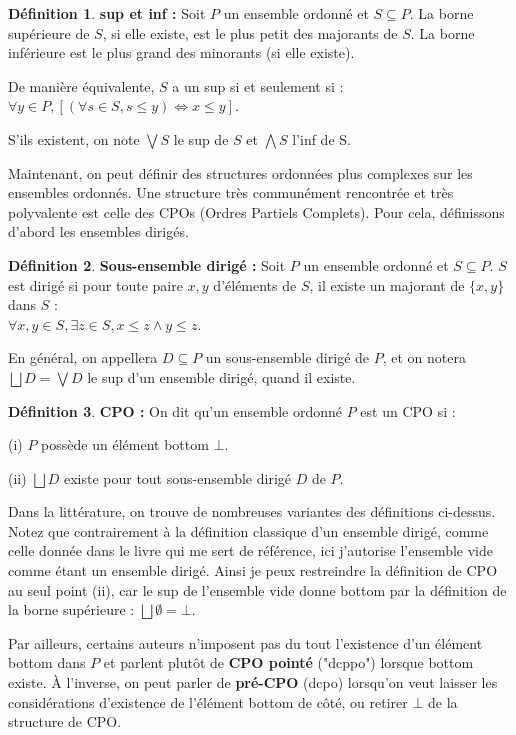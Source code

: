 \documentclass{article}
\theoremstyle{definition}
\newtheorem{definition}{Définition}[section]
\begin{document}
\begin{definition}{\textbf{sup et inf : }}
Soit $P$ un ensemble ordonné et $S \subseteq P$. La borne supérieure de $S$, si elle existe, est le plus petit des majorants de $S$. La borne inférieure est le plus grand des minorants (si elle existe).

De manière équivalente, $S$ a un sup si et seulement si : ~ $\forall y \in P, [(\forall s \in S, s \leq y) \Longleftrightarrow x \leq y]$.

S'ils existent, on note $\bigvee S$ le sup de $S$ et $\bigwedge S$ l'inf de S.
\end{definition}

Maintenant, on peut définir des structures ordonnées plus complexes sur les ensembles ordonnés. Une structure très communément rencontrée et très polyvalente est celle des CPOs (Ordres Partiels Complets). Pour cela, définissons d'abord les ensembles dirigés.

\begin{definition}{\textbf{Sous-ensemble dirigé : }}
Soit $P$ un ensemble ordonné et $S \subseteq P$. $S$ est dirigé si pour toute paire $x,y$ d'éléments de $S$, il existe un majorant de $\{x, y\}$ dans $S$ :\\ $\forall x, y \in S, \exists z \in S, x \leq z \wedge y \leq z$.

En général, on appellera $D \subseteq P$ un sous-ensemble dirigé de $P$, et on notera $\bigsqcup D = \bigvee D$ le sup d'un ensemble dirigé, quand il existe.
\end{definition}

\begin{definition}{\textbf{CPO :}}
On dit qu'un ensemble ordonné $P$ est un CPO si :

(i) $P$ possède un élément bottom $\bot$.

(ii) $\bigsqcup D$ existe pour tout sous-ensemble dirigé $D$ de $P$.
\end{definition}

Dans la littérature, on trouve de nombreuses variantes des définitions ci-dessus. Notez que contrairement à la définition classique d'un ensemble dirigé, comme celle donnée dans le livre qui me sert de référence, ici j'autorise l'ensemble vide comme étant un ensemble dirigé. Ainsi je peux restreindre la définition de CPO au seul point (ii), car le sup de l'ensemble vide donne bottom par la définition de la borne supérieure : $\bigsqcup \emptyset = \bot$.

Par ailleurs, certains auteurs n'imposent pas du tout l'existence d'un élément bottom dans $P$ et parlent plutôt de \textbf{CPO pointé} ("dcppo") lorsque bottom existe. À l'inverse, on peut parler de \textbf{pré-CPO} (dcpo) lorsqu'on veut laisser les considérations d'existence de l'élément bottom de côté, ou retirer $\bot$ de la structure de CPO. %
\end{document}
